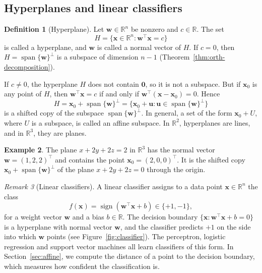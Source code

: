 \documentclass[11pt]{article}
\theoremstyle{definition}
\newtheorem{definition}{Definition}[section]
\newtheorem{example}[definition]{Example}
\theoremstyle{plain}
\theoremstyle{remark}
\newtheorem{remark}[definition]{Remark}
\DeclareMathOperator{\Span}{span}
\DeclareMathOperator{\sign}{sign}
\begin{document}
\subsection{Hyperplanes and linear classifiers}

\begin{definition}[Hyperplane]
    Let $\mathbf{w} \in \mathbb{R}^n$ be nonzero and $c \in \mathbb{R}$. The set
    \[H = \{\mathbf{x} \in \mathbb{R}^n : \mathbf{w}^\top \mathbf{x} = c\}\]
    is called a hyperplane, and $\mathbf{w}$ is called a normal vector of $H$. If $c = 0$, then $H = \Span\{\mathbf{w}\}^\perp$ is a subspace of dimension $n - 1$ (Theorem~\ref{thm:orth-decomposition}).
\end{definition}

If $c \neq 0$, the hyperplane $H$ does not contain $\mathbf{0}$, so it is not a subspace. But if $\mathbf{x}_0$ is any point of $H$, then $\mathbf{w}^\top \mathbf{x} = c$ if and only if $\mathbf{w}^\top (\mathbf{x} - \mathbf{x}_0) = 0$. Hence
\[H = \mathbf{x}_0 + \Span\{\mathbf{w}\}^\perp = \{\mathbf{x}_0 + \mathbf{u} : \mathbf{u} \in \Span\{\mathbf{w}\}^\perp\}\]
is a shifted copy of the subspace $\Span\{\mathbf{w}\}^\perp$. In general, a set of the form $\mathbf{x}_0 + U$, where $U$ is a subspace, is called an affine subspace. In $\mathbb{R}^2$, hyperplanes are lines, and in $\mathbb{R}^3$, they are planes.

\begin{example}
    The plane $x + 2y + 2z = 2$ in $\mathbb{R}^3$ has the normal vector $\mathbf{w} = (1, 2, 2)^\top$ and contains the point $\mathbf{x}_0 = (2, 0, 0)^\top$. It is the shifted copy $\mathbf{x}_0 + \Span\{\mathbf{w}\}^\perp$ of the plane $x + 2y + 2z = 0$ through the origin.
\end{example}

\begin{remark}[Linear classifiers]\label{rem:linear-classifier}
    A linear classifier assigns to a data point $\mathbf{x} \in \mathbb{R}^n$ the class
    \[f(\mathbf{x}) = \sign(\mathbf{w}^\top \mathbf{x} + b) \in \{+1, -1\},\]
    for a weight vector $\mathbf{w}$ and a bias $b \in \mathbb{R}$. The decision boundary $\{\mathbf{x} : \mathbf{w}^\top \mathbf{x} + b = 0\}$ is a hyperplane with normal vector $\mathbf{w}$, and the classifier predicts $+1$ on the side into which $\mathbf{w}$ points (see Figure~\ref{fig:classifier}). The perceptron, logistic regression and support vector machines all learn classifiers of this form. In Section~\ref{sec:affine}, we compute the distance of a point to the decision boundary, which measures how confident the classification is.
\end{remark}
\end{document}
